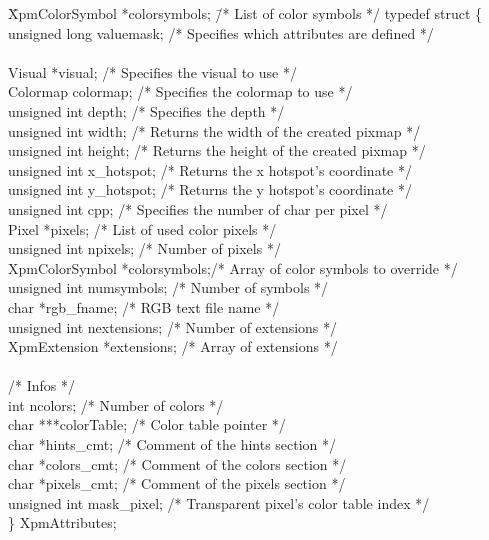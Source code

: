 {\small \begin{tabbing}

\hspace{1cm}\= XpmColorSymbol *colorsymbols; \=/* List of color symbols */\kill
typedef struct \{ \\
\> unsigned long valuemask;  \>/* Specifies which attributes are defined */\\
\\
\> Visual *visual;	     \>/* Specifies the visual to use */ \\
\> Colormap colormap; 	     \>/* Specifies the colormap to use */ \\
\> unsigned int depth;	     \>/* Specifies the depth */ \\
\> unsigned int width;	     \>/* Returns the width of the created pixmap */\\
\> unsigned int height;      \>/* Returns the height of the created pixmap */\\
\> unsigned int x\_hotspot;  \>/* Returns the x hotspot's coordinate */\\
\> unsigned int y\_hotspot;  \>/* Returns the y hotspot's coordinate */ \\
\> unsigned int cpp; 	     \>/* Specifies the number of char per pixel */ \\
\> Pixel *pixels; 	     \>/* List of used color pixels */ \\
\> unsigned int npixels;     \>/* Number of pixels */\\
\> XpmColorSymbol *colorsymbols;\>/* Array of color symbols to override */ \\
\> unsigned int numsymbols;  \>/* Number of symbols */ \\
\> char *rgb\_fname;	     \>/* RGB text file name */ \\
\> unsigned int nextensions; \>/* Number of extensions */ \\
\> XpmExtension *extensions; \>/* Array of extensions */ \\
\\
\> /* Infos */  \\
\> int ncolors;		     \>/* Number of colors */ \\
\> char ***colorTable; 	     \>/* Color table pointer */ \\
\> char *hints\_cmt; 	     \>/* Comment of the hints section */ \\
\> char *colors\_cmt;	     \>/* Comment of the colors section */ \\
\> char *pixels\_cmt;	     \>/* Comment of the pixels section */ \\
\> unsigned int mask\_pixel; \>/* Transparent pixel's color table index */\\
\} XpmAttributes;

\end{tabbing}}

